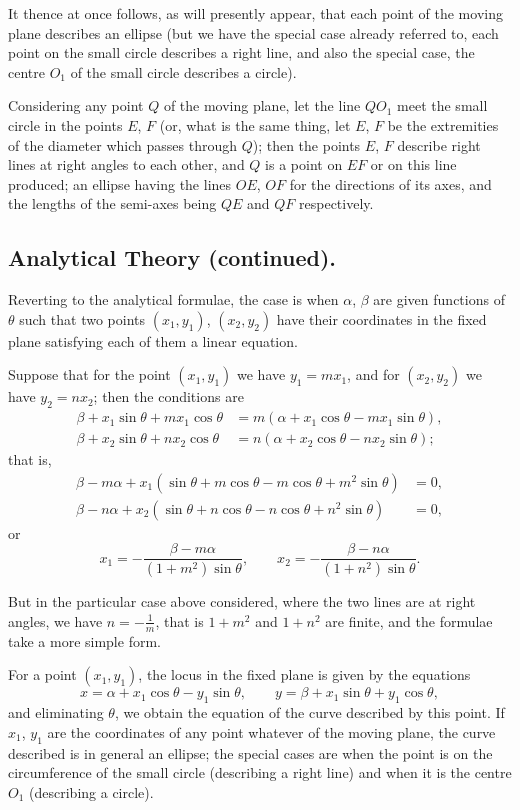 \documentclass[11pt,a4paper]{book}
\begin{document}
It thence at once follows, as will presently appear, that each point of
the moving plane describes an ellipse (but we have the special case already
referred to, each point on the small circle describes a right line, and also
the special case, the centre $O_1$ of the small circle describes a circle).

Considering any point $Q$ of the moving plane, let the line $QO_1$ meet
the small circle in the points $E$, $F$ (or, what is the same thing, let $E$,
$F$ be the extremities of the diameter which passes through $Q$); then
the points $E$, $F$ describe right lines at right angles to each other, and
$Q$ is a point on $EF$ or on this line produced; an ellipse having the lines
$OE$, $OF$ for the directions of its axes, and the lengths of the semi-axes
being $QE$ and $QF$ respectively.

\newpage
\subsection*{Analytical Theory (continued).}

Reverting to the analytical formulae, the case is when $\alpha$, $\beta$ are
given functions of $\theta$ such that two points $(x_1,y_1)$, $(x_2,y_2)$ have
their coordinates in the fixed plane satisfying each of them a linear equation.

Suppose that for the point $(x_1,y_1)$ we have $y_1=mx_1$, and for
$(x_2,y_2)$ we have $y_2=nx_2$; then the conditions are
\begin{align*}
\beta + x_1\sin\theta + mx_1\cos\theta &= m(\alpha + x_1\cos\theta - mx_1\sin\theta),\\
\beta + x_2\sin\theta + nx_2\cos\theta &= n(\alpha + x_2\cos\theta - nx_2\sin\theta);
\end{align*}
that is,
\begin{align*}
\beta - m\alpha + x_1(\sin\theta+m\cos\theta-m\cos\theta+m^2\sin\theta) &= 0,\\
\beta - n\alpha + x_2(\sin\theta+n\cos\theta-n\cos\theta+n^2\sin\theta) &= 0,
\end{align*}
or
\[
x_1 = -\frac{\beta-m\alpha}{(1+m^2)\sin\theta},\qquad
x_2 = -\frac{\beta-n\alpha}{(1+n^2)\sin\theta}.
\]

But in the particular case above considered, where the two lines are at
right angles, we have $n=-\frac{1}{m}$, that is $1+m^2$ and $1+n^2$ are finite,
and the formulae take a more simple form.

For a point $(x_1,y_1)$, the locus in the fixed plane is given by the
equations
\[
x = \alpha+x_1\cos\theta-y_1\sin\theta,\qquad
y = \beta+x_1\sin\theta+y_1\cos\theta,
\]
and eliminating $\theta$, we obtain the equation of the curve described by this
point. If $x_1$, $y_1$ are the coordinates of any point whatever of the moving
plane, the curve described is in general an ellipse; the special cases are
when the point is on the circumference of the small circle (describing a right
line) and when it is the centre $O_1$ (describing a circle).
\end{document}
